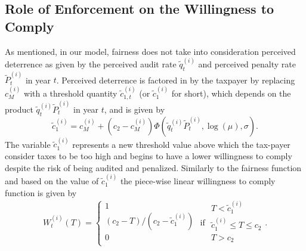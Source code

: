\documentclass{NSF_proposal_mod}
\begin{document}
\subsection{Role of Enforcement on the Willingness to Comply}

As mentioned, in our model, fairness does not take into consideration perceived deterrence as given by the perceived audit rate  $\tilde{q}^{(i)}_t$ and perceived penalty rate $\tilde{P}^{(i)}_t$ in year $t$. Perceived deterrence is factored in by the taxpayer by replacing $c_M^{(i)}$ with a threshold quantity $\tilde{c}^{(i)}_{1,t}$ (or $\tilde{c}^{(i)}_1$ for short), which depends on the product  $\tilde{q}^{(i)}_t\tilde{P}^{(i)}_t$ in year $t$,  and is given by
\begin{equation}
\tilde{c}^{(i)}_1 = c_M^{(i)}+(c_2-c_M^{(i)})\Phi(\tilde{q}^{(i)}_t\tilde{P}^{(i)}_t,\log(\mu),\sigma).
\label{eq:c1_tilde}
\end{equation} 
The variable $\tilde{c}^{(i)}_1$ represents a new threshold value  above which the tax-payer consider taxes to be too high and begins to have a lower willingness to comply despite the risk of being audited and penalized. Similarly to the fairness function and based on the value of  $\tilde{c}^{(i)}_1$ the piece-wise linear willingness to comply function is given by  
\begin{equation}
W^{(i)}_t(T)= \left\{ 
\begin{array}{c}
1 \\
 {(c_2-T)}/{(c_2-\tilde{c}^{(i)}_1)} \\
0 \\
\end{array} \right .\mbox{ if }
\begin{array}{c}
T<\tilde{c}^{(i)}_1\\
\tilde{c}^{(i)}_1\le T\le c_2\\
T>c_2\\
\end{array}.
\end{equation}
\end{document}
